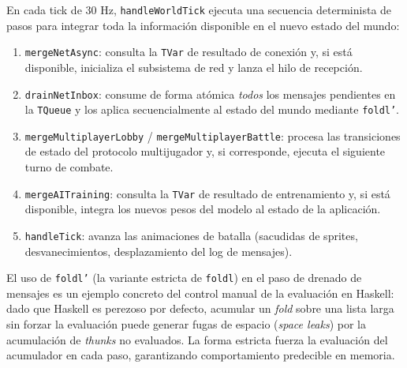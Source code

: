 En cada tick de 30 Hz, \texttt{handleWorldTick} ejecuta una secuencia determinista de pasos para integrar toda la información disponible en el nuevo estado del mundo:

\begin{enumerate}
    \item \texttt{mergeNetAsync}: consulta la \texttt{TVar} de resultado de conexión y, si está disponible, inicializa el subsistema de red y lanza el hilo de recepción.
    \item \texttt{drainNetInbox}: consume de forma atómica \textit{todos} los mensajes pendientes en la \texttt{TQueue} y los aplica secuencialmente al estado del mundo mediante \texttt{foldl'}.
    \item \texttt{mergeMultiplayerLobby} / \texttt{mergeMultiplayerBattle}: procesa las transiciones de estado del protocolo multijugador y, si corresponde, ejecuta el siguiente turno de combate.
    \item \texttt{mergeAITraining}: consulta la \texttt{TVar} de resultado de entrenamiento y, si está disponible, integra los nuevos pesos del modelo al estado de la aplicación.
    \item \texttt{handleTick}: avanza las animaciones de batalla (sacudidas de sprites, desvanecimientos, desplazamiento del log de mensajes).
\end{enumerate}

El uso de \texttt{foldl'} (la variante estricta de \texttt{foldl}) en el paso de drenado de mensajes es un ejemplo concreto del control manual de la evaluación en Haskell: dado que Haskell es perezoso por defecto, acumular un \textit{fold} sobre una lista larga sin forzar la evaluación puede generar fugas de espacio (\textit{space leaks}) por la acumulación de \textit{thunks} no evaluados. La forma estricta fuerza la evaluación del acumulador en cada paso, garantizando comportamiento predecible en memoria.

\clearpage
